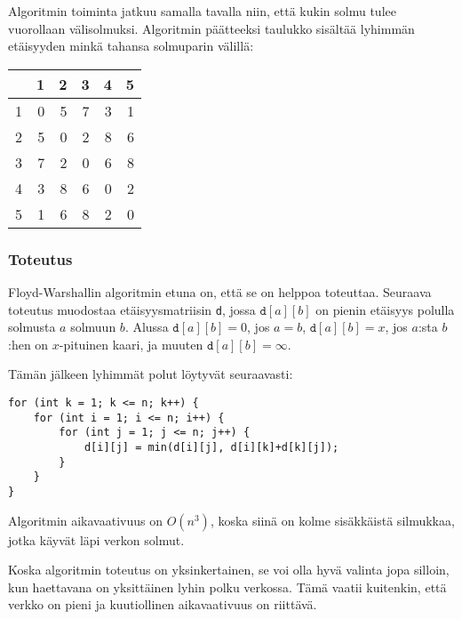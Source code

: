 Algoritmin toiminta jatkuu samalla tavalla
niin, että kukin solmu tulee vuorollaan
välisolmuksi.
Algoritmin päätteeksi taulukko sisältää
lyhimmän etäisyyden minkä tahansa
solmuparin välillä:

\begin{center}
\begin{tabular}{r|rrrrr}
 & 1 & 2 & 3 & 4 & 5 \\
\hline
1 & 0 & 5 & 7 & 3 & 1 \\
2 & 5 & 0 & 2 & 8 & 6 \\
3 & 7 & 2 & 0 & 6 & 8 \\
4 & 3 & 8 & 6 & 0 & 2 \\
5 & 1 & 6 & 8 & 2 & 0 \\
\end{tabular}
\end{center}

\subsubsection{Toteutus}

Floyd-Warshallin algoritmin etuna on,
että se on helppoa toteuttaa.
Seuraava toteutus muodostaa etäisyysmatriisin
\texttt{d}, jossa $\texttt{d}[a][b]$
on pienin etäisyys polulla solmusta $a$ solmuun $b$.
Alussa $\texttt{d}[a][b]=0$, jos $a=b$,
$\texttt{d}[a][b]=x$, jos $a$:sta $b$:hen
on $x$-pituinen kaari,
ja muuten $\texttt{d}[a][b]=\infty$.

Tämän jälkeen lyhimmät polut löytyvät seuraavasti:

\begin{lstlisting}
for (int k = 1; k <= n; k++) {
    for (int i = 1; i <= n; i++) {
        for (int j = 1; j <= n; j++) {
            d[i][j] = min(d[i][j], d[i][k]+d[k][j]);
        }
    }
}
\end{lstlisting}

Algoritmin aikavaativuus on
$O(n^3)$, koska siinä on kolme sisäkkäistä
silmukkaa,
jotka käyvät läpi verkon solmut.

Koska algoritmin toteutus on yksinkertainen,
se voi olla hyvä valinta jopa silloin,
kun haettavana on yksittäinen
lyhin polku verkossa.
Tämä vaatii kuitenkin, että verkko on pieni
ja kuutiollinen aikavaativuus on riittävä.

